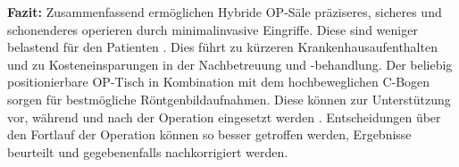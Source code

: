 \textbf{Fazit:} Zusammenfassend ermöglichen Hybride OP-Säle präziseres, sicheres und schonenderes operieren durch minimalinvasive Eingriffe. Diese sind weniger belastend für den Patienten \cite{DresdnerUniklinikum}. Dies führt zu kürzeren Krankenhausaufenthalten und zu Kosteneinsparungen in der Nachbetreuung und -behandlung. Der beliebig positionierbare OP-Tisch in Kombination mit dem hochbeweglichen C-Bogen sorgen für bestmögliche Röntgenbildaufnahmen. Diese können zur Unterstützung vor, während und nach der Operation eingesetzt werden \cite{DresdnerUniklinikum}. Entscheidungen über den Fortlauf der Operation können so besser getroffen werden, Ergebnisse beurteilt und gegebenenfalls nachkorrigiert werden.

